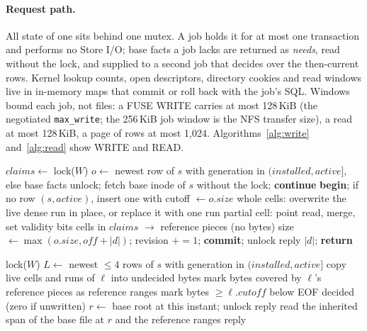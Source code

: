 \paragraph{Request path.} All state of one \ws{} sits behind one mutex. A job holds it
for at most one transaction and performs no Store I/O; base facts a job lacks are
returned as \emph{needs}, read without the lock, and supplied to a second job that
decides over the then-current rows. Kernel lookup counts, open descriptors, directory
cookies and read windows live in in-memory maps that commit or roll back with the job's
SQL. Windows bound each job, not files: a FUSE WRITE carries at most 128\,KiB (the
negotiated \texttt{max\_write}; the 256\,KiB job window is the NFS transfer size), a read
at most 128\,KiB, a page of rows at most 1,024. Algorithms~\ref{alg:write}
and~\ref{alg:read} show WRITE and READ.

\begin{algorithm}[h]
\caption{FUSE WRITE$(s, \mathit{off}, d)$, $|d| \leq 128$\,KiB}
\label{alg:write}
\small
\begin{algorithmic}[1]
\State $\mathit{claims} \gets$  
\Loop
  \State lock($W$) 
  \State $o \gets$ newest row of $s$ with generation in $(\mathit{installed}, \mathit{active}]$, else base facts
   unlock; fetch base inode of $s$ without the lock; \textbf{continue} \EndIf
  \State \textbf{begin}; if no row $(s, \mathit{active})$, insert one with cutoff $\gets o.\mathit{size}$
  \ForAll{32\,KiB slots overlapping $[\mathit{off}, \mathit{off}+|d|)$}
    \State whole cells: overwrite the live dense run in place, or replace it with one run
    \State partial cell: point read, merge, set validity bits 
  \EndFor
  \State cells in $\mathit{claims}$ $\rightarrow$ reference pieces (no bytes)
  \State size $\gets \max(o.\mathit{size}, \mathit{off}+|d|)$; revision $\mathrel{+}= 1$; \textbf{commit}; unlock
  \State reply $|d|$; \textbf{return}
\EndLoop
\end{algorithmic}
\end{algorithm}

\begin{algorithm}[h]
\caption{FUSE READ$(s, \mathit{off}, n)$, $n \leq 128$\,KiB}
\label{alg:read}
\small
\begin{algorithmic}[1]
\State lock($W$) 
\State $L \gets$ newest $\leq 4$ rows of $s$ with generation in $(\mathit{installed}, \mathit{active}]$
  \State copy live cells and runs of $\ell$ into undecided bytes
  \State mark bytes covered by $\ell$'s reference pieces as reference ranges
  \State mark bytes $\geq \ell.\mathit{cutoff}$ below EOF decided (zero if unwritten)
\EndFor
\State $r \gets$ base root at this instant; unlock
 reply \EndIf
\State read the inherited span of the base file at $r$ and the reference ranges 
\State reply
\end{algorithmic}
\end{algorithm}

